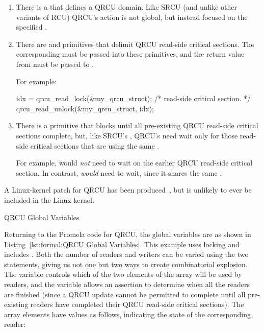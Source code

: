 \begin{enumerate}
\item	There is a  that defines a QRCU domain.
	Like SRCU (and unlike other variants of RCU) QRCU's action
	is not global, but instead focused on the specified
	.
\item	There are  and 
	primitives that delimit QRCU read-side critical sections.
	The corresponding  must be passed into
	these primitives, and the return value from 
	must be passed to .

	For example:

\begin{VerbatimU}
idx = qrcu_read_lock(&my_qrcu_struct);
/* read-side critical section. */
qrcu_read_unlock(&my_qrcu_struct, idx);
\end{VerbatimU}

\item	There is a  primitive that blocks until
	all pre-existing QRCU read-side critical sections complete,
	but, like SRCU's , QRCU's
	 need wait only for those read-side
	critical sections that are using the same .

	For example, 
	would \emph{not} need to wait on the earlier QRCU read-side
	critical section.
	In contrast, 
	\emph{would} need to wait, since it shares the same
	.
\end{enumerate}

A Linux-kernel patch for QRCU has been
produced~\cite{PaulMcKenney2007QRCUpatch},
but is unlikely to ever be included in the Linux kernel.

\begin{listing}

\caption{QRCU Global Variables}
\label{lst:formal:QRCU Global Variables}
\end{listing}

Returning to the Promela code for QRCU, the global variables are as shown in
Listing~\ref{lst:formal:QRCU Global Variables}.
This example uses locking and includes .
Both the number of readers and writers can be varied using the
two  statements, giving us not one but two ways to create
combinatorial explosion.
The  variable controls which of the two elements of the 
array will be used by readers, and the  variable
allows an assertion to determine when all the readers are finished
(since a QRCU update cannot be permitted to complete until all
pre-existing readers have completed their QRCU read-side critical
sections).
The  array elements have values as follows,
indicating the state of the corresponding reader:

